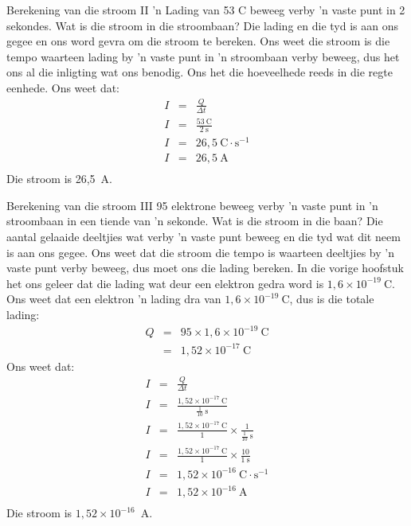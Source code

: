 \begin{wex}{Berekening van die stroom II}
{ 'n Lading van 53 C beweeg verby  'n vaste punt in 2 sekondes. Wat is die stroom
in die stroombaan?
}{%
Die lading en die tyd is aan ons gegee en ons word gevra om die stroom te
bereken. Ons weet die stroom is die tempo waarteen lading by  'n vaste punt in
 'n stroombaan verby beweeg, dus het ons al die inligting wat ons benodig. Ons
het die hoeveelhede reeds in die regte eenhede.
Ons weet dat:
\begin{eqnarray*}
I &=& \frac{Q}{\Delta t} \\
I &=& \frac{53~\text{C}}{2~\text{s}} \\
I &=& 26,5~\text{C} \cdot \text{s}^{-1} \\
I &=& 26,5~\text{A} \\
\end{eqnarray*}
Die stroom is 26,5~A.
}
\end{wex}

\begin{wex}{Berekening van die stroom III}
{95 elektrone beweeg verby  'n vaste punt in  'n stroombaan in een tiende van 'n
sekonde. Wat is die stroom in die baan?
}{%
Die aantal gelaaide deeltjies wat verby  'n vaste punt beweeg en die tyd wat
dit neem is aan ons gegee. Ons weet dat die stroom die tempo is waarteen
deeltjies by  'n vaste punt verby beweeg, dus moet ons die lading bereken. In die
vorige hoofstuk het ons geleer dat die lading wat deur een elektron gedra word
is $1,6\times10^{-19}~\text{C}$.
Ons weet dat een elektron  'n lading dra van $1,6\times10^{-19}~\text{C}$,
dus is die totale lading:
\begin{eqnarray*}
Q & = & 95 \times 1,6\times10^{-19}~\text{C} \\
& = & 1,52\times10^{-17}~\text{C} 
\end{eqnarray*}
Ons weet dat:
\begin{eqnarray*}
I &=& \frac{Q}{\Delta t} \\
I &=& \frac{1,52\times10^{-17}~\text{C}}{\frac{1}{10}~\text{s}} \\
I &=&
\frac{1,52\times10^{-17}~\text{C}}{1}\times{\frac{1}{{\frac{1}{10}~\text{s}}}}
\\
I &=& \frac{1,52\times10^{-17}~\text{C}}{1}\times\frac{10}{1~\text{s}} \\
I &=& 1,52\times10^{-16}~\text{C} \cdot \text{s}^{-1} \\
I &=& 1,52\times10^{-16}~\text{A} \\
\end{eqnarray*}
Die stroom is $1,52\times10^{-16}$~A.
}
\end{wex}


